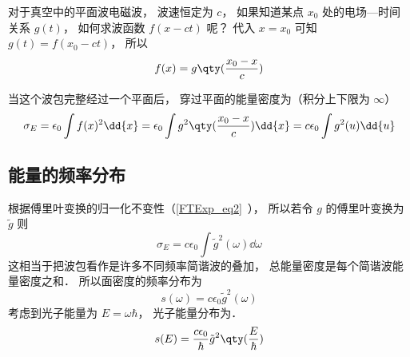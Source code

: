 

对于真空中的平面波电磁波， 波速恒定为 $c$， 如果知道某点 $x_0$ 处的电场—时间关系 $g(t)$， 如何求波函数 $f(x - ct)$ 呢？ 代入 $x = x_0$ 可知 $g(t) = f(x_0 - ct)$， 所以
\begin{equation}
f(x) = g\qty(\frac{x_0 - x}{c})
\end{equation}

当这个波包完整经过一个平面后， 穿过平面的能量密度为（积分上下限为 $\infty$）
\begin{equation}\label{WpEng_eq1}
\sigma_E = \epsilon_0 \int f(x)^2 \dd{x} = \epsilon_0  \int g^2\qty(\frac{x_0 - x}{c}) \dd{x} = c\epsilon_0 \int g^2(u) \dd{u}
\end{equation}

\subsection{能量的频率分布}
根据傅里叶变换的归一化不变性（\autoref{FTExp_eq2}~）， 所以若令 $g$ 的傅里叶变换为 $\tilde g$ 则
\begin{equation}
\sigma_E = c\epsilon_0 \int {\tilde g}^2(\omega) \dd{\omega}
\end{equation}
这相当于把波包看作是许多不同频率简谐波的叠加， 总能量密度是每个简谐波能量密度之和． 所以面密度的频率分布为
\begin{equation}
s(\omega) = c\epsilon_0 {\tilde g}^2(\omega)
\end{equation}
考虑到光子能量为 $E = \omega\hbar$， 光子能量分布为．
\begin{equation}
s(E) = \frac{c\epsilon_0}{\hbar} {\tilde g}^2\qty(\frac{E}{\hbar})
\end{equation}
